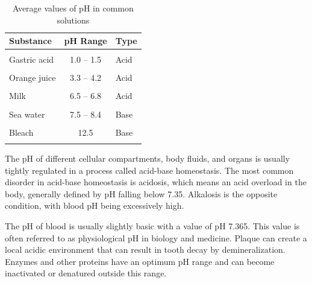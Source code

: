 \begin{table}[!h]

\caption{\label{tab:solutions}Average values of pH in common solutions}
\centering
\begin{tabular}[t]{lcl}
\toprule
Substance & pH Range & Type\\
\midrule
\cellcolor{gray!6}{Battery acid} & \cellcolor{gray!6}{< 1} & \cellcolor{gray!6}{Acid}\\
Gastric acid & 1.0 – 1.5 & Acid\\
\cellcolor{gray!6}{Vinegar} & \cellcolor{gray!6}{2.5} & \cellcolor{gray!6}{Acid}\\
Orange juice & 3.3 – 4.2 & Acid\\
\cellcolor{gray!6}{Black coffee} & \cellcolor{gray!6}{5 – 5.03} & \cellcolor{gray!6}{Acid}\\
\addlinespace
Milk & 6.5 – 6.8 & Acid\\
\cellcolor{gray!6}{Pure water} & \cellcolor{gray!6}{7} & \cellcolor{gray!6}{Neutral}\\
Sea water & 7.5 – 8.4 & Base\\
\cellcolor{gray!6}{Ammonia} & \cellcolor{gray!6}{11.0 – 11.5} & \cellcolor{gray!6}{Base}\\
Bleach & 12.5 & Base\\
\addlinespace
\cellcolor{gray!6}{Lye} & \cellcolor{gray!6}{13.0 – 13.} & \cellcolor{gray!6}{Base}\\
\bottomrule
\end{tabular}
\end{table}

The pH of different cellular compartments, body fluids, and organs is usually tightly regulated in a process called acid-base homeostasis. The most common disorder in acid-base homeostasis is acidosis, which means an acid overload in the body, generally defined by pH falling below 7.35. Alkalosis is the opposite condition, with blood pH being excessively high.

The pH of blood is usually slightly basic with a value of pH 7.365. This value is often referred to as physiological pH in biology and medicine. Plaque can create a local acidic environment that can result in tooth decay by demineralization. Enzymes and other proteins have an optimum pH range and can become inactivated or denatured outside this range.

